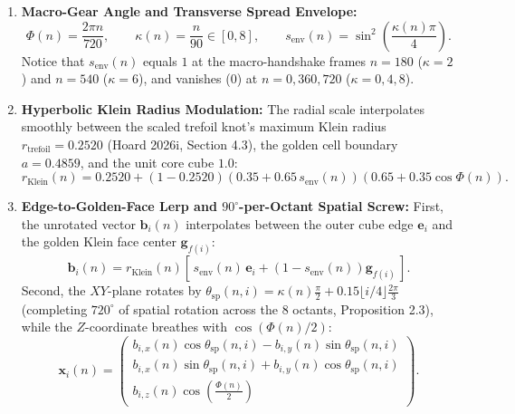 \documentclass[11pt, a4paper]{article}
\begin{document}
\begin{enumerate}
    \item \textbf{Macro-Gear Angle and Transverse Spread Envelope:}
    \begin{equation}
    \Phi(n) = \frac{2\pi n}{720}, \qquad \kappa(n) = \frac{n}{90} \in [0, 8], \qquad s_{\text{env}}(n) = \sin^2\!\left(\frac{\kappa(n)\pi}{4}\right).
    \end{equation}
    Notice that $s_{\text{env}}(n)$ equals $1$ at the macro-handshake frames $n = 180$ ($\kappa = 2$) and $n = 540$ ($\kappa = 6$), and vanishes ($0$) at $n = 0, 360, 720$ ($\kappa = 0, 4, 8$).
    \item \textbf{Hyperbolic Klein Radius Modulation:}
    The radial scale interpolates smoothly between the scaled trefoil knot's maximum Klein radius $r_{\text{trefoil}} = 0.2520$ (Hoard 2026i, Section 4.3), the golden cell boundary $a = 0.4859$, and the unit core cube $1.0$:
    \begin{equation}
    r_{\text{Klein}}(n) = 0.2520 + (1 - 0.2520)\left(0.35 + 0.65\,s_{\text{env}}(n)\right)\left(0.65 + 0.35\cos\Phi(n)\right).
    \end{equation}
    \item \textbf{Edge-to-Golden-Face Lerp and $90^\circ$-per-Octant Spatial Screw:}
    First, the unrotated vector $\mathbf{b}_i(n)$ interpolates between the outer cube edge $\mathbf{e}_i$ and the golden Klein face center $\mathbf{g}_{f(i)}$:
    \begin{equation}
    \mathbf{b}_i(n) = r_{\text{Klein}}(n)\left[\,s_{\text{env}}(n)\,\mathbf{e}_i + \left(1 - s_{\text{env}}(n)\right)\mathbf{g}_{f(i)}\,\right].
    \end{equation}
    Second, the $XY$-plane rotates by $\theta_{\text{sp}}(n, i) = \kappa(n)\frac{\pi}{2} + 0.15\lfloor i/4\rfloor\frac{2\pi}{3}$ (completing $720^\circ$ of spatial rotation across the 8 octants, Proposition 2.3), while the $Z$-coordinate breathes with $\cos(\Phi(n)/2)$:
    \begin{equation}
    \mathbf{x}_i(n) = \begin{pmatrix}
    b_{i,x}(n)\cos\theta_{\text{sp}}(n,i) - b_{i,y}(n)\sin\theta_{\text{sp}}(n,i) \\[0.3em]
    b_{i,x}(n)\sin\theta_{\text{sp}}(n,i) + b_{i,y}(n)\cos\theta_{\text{sp}}(n,i) \\[0.3em]
    b_{i,z}(n)\cos\!\left(\frac{\Phi(n)}{2}\right)
    \end{pmatrix}.
    \label{eq:exact-node-pos}
    \end{equation}
\end{enumerate}
\end{document}
